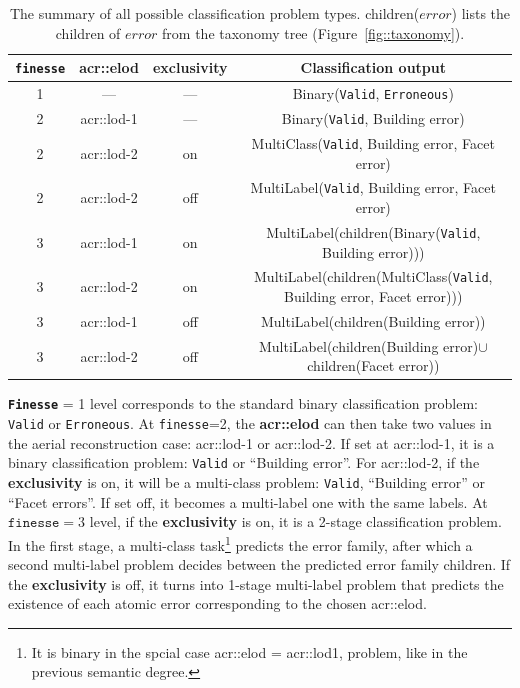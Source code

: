         \begin{table}
            \begin{tabular}{c c c c}
                \toprule
                \textbf{\texttt{finesse}} & \textbf{\gls{acr::elod}} & \textbf{exclusivity} & \textbf{Classification output}\\
                \midrule
                \scriptsize
                1 & --- & --- & Binary(\texttt{Valid}, \texttt{Erroneous})\\
                2 & \gls{acr::lod}-1 & --- & Binary(\texttt{Valid}, Building error)\\
                2 & \gls{acr::lod}-2 & on & MultiClass(\texttt{Valid}, Building error, Facet error)\\
                2 & \gls{acr::lod}-2 & off & MultiLabel(\texttt{Valid}, Building error, Facet error)\\
                3 & \gls{acr::lod}-1 & on & MultiLabel(children(Binary(\texttt{Valid}, Building error)))\\
                3 & \gls{acr::lod}-2 & on & MultiLabel(children(MultiClass(\texttt{Valid}, Building error, Facet error)))\\
                3 & \gls{acr::lod}-1 & off & MultiLabel(children(Building error))\\
                3 & \gls{acr::lod}-2 & off & MultiLabel(children(Building error)$\cup$ children(Facet error))\\
                \bottomrule
            \end{tabular}
            \caption{
                \label{tab::problems} The summary of all possible classification problem types.
                children($error$) lists the children of $error$ from the taxonomy tree (Figure~\ref{fig::taxonomy}).
            }
        \end{table}
            
        \textbf{\texttt{Finesse}} = 1 level corresponds to the standard binary classification problem: \texttt{Valid} or \texttt{Erroneous}.
        At \texttt{finesse}=2, the \textbf{\gls{acr::elod}} can then take two values in the aerial reconstruction case: \gls{acr::lod}-1 or \gls{acr::lod}-2.
        If set at \gls{acr::lod}-1, it is a binary classification problem: \texttt{Valid} or ``Building error''.
        For \gls{acr::lod}-2, if the \textbf{exclusivity} is on, it will be a multi-class problem: \texttt{Valid}, ``Building error'' or ``Facet errors''.
        If set off, it becomes a multi-label one with the same labels.
        At $\texttt{finesse}=3$ level, if the \textbf{exclusivity} is on, it is a 2-stage classification problem.
        In the first stage, a multi-class task\footnote{It is binary in the spcial case \gls{acr::elod} = \gls{acr::lod}1, problem, like in the previous semantic degree.}
        predicts the error family, after which a second multi-label problem decides between the predicted error family children.
        If the \textbf{exclusivity} is off, it turns into  1-stage multi-label problem that predicts the existence of each atomic error corresponding to the chosen \gls{acr::elod}.

